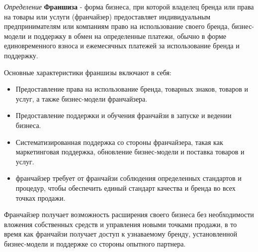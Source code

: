\textit{Определение} \textbf{Франшиза} -  форма бизнеса, при которой владелец бренда или права на товары или услуги (франчайзер) предоставляет индивидуальным предпринимателям или компаниям  право на использование своего бренда, бизнес-модели и поддержку в обмен на определенные платежи, обычно в форме единовременного взноса и ежемесячных платежей  за использование бренда и поддержку. \cite{caves2014franchising}

Основные характеристики франшизы включают в себя:
\begin{itemize}
    \item Предоставление права на использование бренда, товарных знаков, товаров и услуг, а также бизнес-модели франчайзера. 
    \item Предоставление поддержки и обучения франчайзи в запуске и ведении бизнеса.
    \item Систематизированная поддержка со стороны франчайзера, такая как маркетинговая поддержка, обновление бизнес-модели и поставка товаров и услуг.
    \item франчайзер требует от франчайзи соблюдения определенных стандартов и процедур, чтобы обеспечить единый стандарт качества и бренда во всех точках продажи.
\end{itemize}

Франчайзер получает возможность расширения своего бизнеса без необходимости вложения собственных средств и управления новыми точками продажи, в то время как франчайзи получает доступ к узнаваемому бренду, установленной бизнес-модели и поддержке со стороны опытного партнера.
